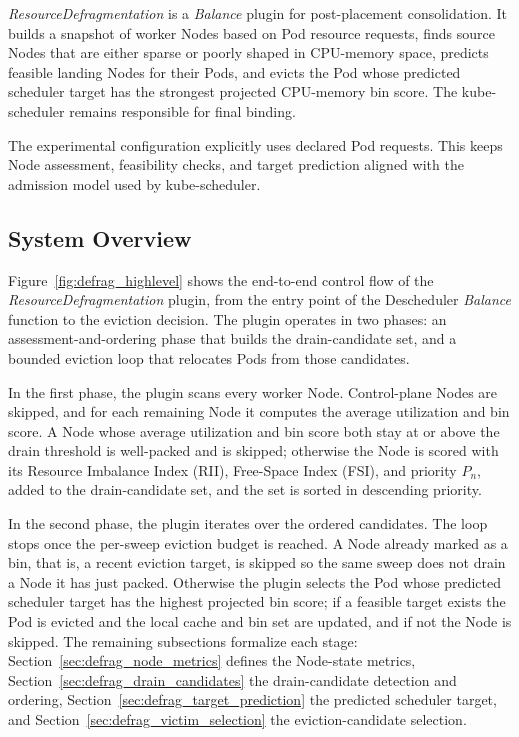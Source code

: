 \textit{ResourceDefragmentation} is a \textit{Balance} plugin for post-placement consolidation. It builds a snapshot of worker Nodes based on Pod resource requests, finds source Nodes that are either sparse or poorly shaped in CPU-memory space, predicts feasible landing Nodes for their Pods, and evicts the Pod whose predicted scheduler target has the strongest projected CPU-memory bin score. The kube-scheduler remains responsible for final binding.

The experimental configuration explicitly uses declared Pod requests. This keeps Node assessment, feasibility checks, and target prediction aligned with the admission model used by kube-scheduler.

\subsection{System Overview}
\label{sec:defrag_system_overview}

Figure~\ref{fig:defrag_highlevel} shows the end-to-end control flow of the \textit{ResourceDefragmentation} plugin, from the entry point of the Descheduler \textit{Balance} function to the eviction decision. The plugin operates in two phases: an assessment-and-ordering phase that builds the drain-candidate set, and a bounded eviction loop that relocates Pods from those candidates.

In the first phase, the plugin scans every worker Node. Control-plane Nodes are skipped, and for each remaining Node it computes the average utilization and bin score. A Node whose average utilization and bin score both stay at or above the drain threshold is well-packed and is skipped; otherwise the Node is scored with its Resource Imbalance Index (RII), Free-Space Index (FSI), and priority \(P_n\), added to the drain-candidate set, and the set is sorted in descending priority.

In the second phase, the plugin iterates over the ordered candidates. The loop stops once the per-sweep eviction budget is reached. A Node already marked as a bin, that is, a recent eviction target, is skipped so the same sweep does not drain a Node it has just packed. Otherwise the plugin selects the Pod whose predicted scheduler target has the highest projected bin score; if a feasible target exists the Pod is evicted and the local cache and bin set are updated, and if not the Node is skipped. The remaining subsections formalize each stage: Section~\ref{sec:defrag_node_metrics} defines the Node-state metrics, Section~\ref{sec:defrag_drain_candidates} the drain-candidate detection and ordering, Section~\ref{sec:defrag_target_prediction} the predicted scheduler target, and Section~\ref{sec:defrag_victim_selection} the eviction-candidate selection.

